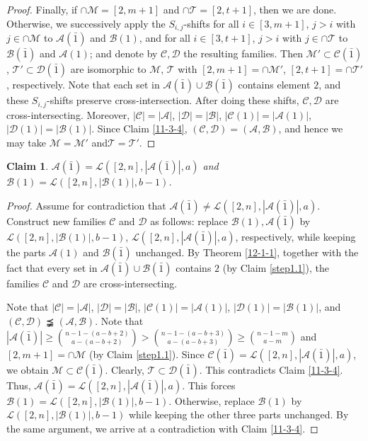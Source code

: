 \documentclass[11pt]{article}
\newcommand{\m}{\mathcal}
\newtheorem{claim}[theorem]{Claim}
\begin{document}
\begin{proof}
Finally, if $\cap \m M=[2,m+1]$ and $\cap \m T=[2,t+1]$, then we are done.
Otherwise, 
we successively apply the $S_{i,j}$-shifts for all $i\in [3,m+1]$, $j>i$ with $j\in \cap \m M$ to $\mathcal{A}(\bar{1})$ and $\mathcal{B}(1)$,  
and for all $i\in [3,t+1]$, $j>i$ with $j\in \cap \m T$ to $\mathcal{B}(\bar{1})$ and $\mathcal{A}(1)$;
and denote by $\m C, \m D$ the resulting families. 
Then $\mathcal{M}'\subset \m C(\bar1)$, $\mathcal{T}'\subset \m D(\bar1)$  are isomorphic to $\mathcal{M}$, $\m T$ with $[2,m+1]=\cap \m M'$, $[2,t+1]=\cap \m T'$, respectively. Note that each set in $\mathcal{A}(\bar{1})\cup \mathcal{B}(\bar{1})$ contains element $2$, and these $S_{i,j}$-shifts preserve cross-intersection. After doing these shifts, $\m C, \m D$ are cross-intersecting.
Moreover, $|\m C|=|\m A|$, 
$|\m D|=|\m B|$,
$|\m C(1)|=|\m A(1)|$,
$|\m D(1)|=|\m B(1)|$.
Since Claim \ref{11-3-4}, $(\m C, \m D)=(\m A, \m B)$, and hence we may take $\m M=\m M'$ and$\m T=\m T'$.
\end{proof}



 
\begin{claim}\label{12-11-1}
$\mathcal{A}(\bar{1})=\mathcal{L}([2, n], |\mathcal{A}(\bar{1})|, a)$ and $\mathcal{B}(1)=\mathcal{L}([2, n], |\mathcal{B}(1)|, b-1)$.
\end{claim}

\begin{proof}
Assume for contradiction that $\mathcal{A}(\bar{1})\ne \mathcal{L}([2, n], |\mathcal{A}(\bar{1})|, a)$. Construct new families $\m C$ and $\m D$ as follows:  replace $\mathcal{B}(1), \mathcal{A}(\bar{1})$ by $\mathcal{L}([2, n], |\mathcal{B}(1)|, b-1)$, $\mathcal{L}([2, n], |\mathcal{A}(\bar{1})|, a)$, respectively, 
while keeping the parts $\mathcal{A}(1)$ and $\mathcal{B}(\bar{1})$ unchanged.
By Theorem \ref{12-1-1}, together with the fact that every set in $\m A(\bar1)\cup \m B(\bar1)$ contains $2$ (by Claim \ref{step1.1}), the families $\m C$ and $\m D$ are cross-intersecting.  

Note that $|\m C|=|\m A|$, $|\m D|=|\m B|$, $|\m C(1)|=|\m A(1)|$, $|\m D(1)|=|\m B(1)|$, and $(\m C, \m D)\precneqq (\m A, \m B)$. 
Note that $|\mathcal{A}(\bar{1})|\ge {n-1-(a-b+2)\choose a-(a-b+2)}>{n-1-(a-b+3)\choose a-(a-b+3)}\ge {n-1-m \choose a-m}$ and $[2,m+1]=\cap \m M$ (by Claim \ref{step1.1}). 
Since $\m C(\bar{1})=\m L([2,n], |\m A(\bar1)|,a)$, we obtain $\mathcal{M}\subset \m C(\bar{1})$. 
Clearly, $\mathcal{T}\subset \m D(\bar{1})$.
This contradicts Claim \ref{11-3-4}. Thus, $\mathcal{A}(\bar{1})=\mathcal{L}([2, n], |\mathcal{A}(\bar{1})|, a)$. This forces $\mathcal{B}(1)=\mathcal{L}([2, n], |\mathcal{B}(1)|, b-1)$. Otherwise, replace  $\mathcal B(1)$ by
$\mathcal L([2,n],|\mathcal B(1)|,b-1)$ while keeping the other
three parts unchanged. By the same argument, we arrive at a contradiction with Claim \ref{11-3-4}. 
\end{proof}
\end{document}
